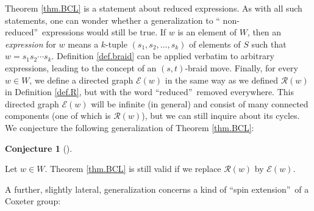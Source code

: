 \documentclass
[numbers=enddot,12pt,final,onecolumn,notitlepage,abstracton]{scrartcl}%
\theoremstyle{definition}
\newtheorem{conj}[theo]{Conjecture}
\newenvironment{conjecture}[1][]
{\begin{conj}[#1]\begin{leftbar}}
{\end{leftbar}\end{conj}}
\begin{document}
Theorem \ref{thm.BCL} is a statement about reduced expressions. As with all
such statements, one can wonder whether a generalization to \textquotedblleft
non-reduced\textquotedblright\ expressions would still be true. If $w$ is an
element of $W$, then an \emph{expression} for $w$ means a $k$-tuple $\left(
s_{1},s_{2},\ldots,s_{k}\right)  $ of elements of $S$ such that $w=s_{1}%
s_{2}\cdots s_{k}$. Definition \ref{def.braid} can be applied verbatim to
arbitrary expressions, leading to the concept of an $\left(  s,t\right)
$-braid move. Finally, for every $w\in W$, we define a directed graph
$\mathcal{E}\left(  w\right)  $ in the same way as we defined $\mathcal{R}%
\left(  w\right)  $ in Definition \ref{def.R}, but with the word
\textquotedblleft reduced\textquotedblright\ removed everywhere. This directed
graph $\mathcal{E}\left(  w\right)  $ will be infinite (in general) and
consist of many connected components (one of which is $\mathcal{R}\left(
w\right)  $), but we can still inquire about its cycles. We conjecture the
following generalization of Theorem \ref{thm.BCL}:

\begin{conjecture}
\label{conj.E(w)}Let $w\in W$. Theorem \ref{thm.BCL} is still valid if we
replace $\mathcal{R}\left(  w\right)  $ by $\mathcal{E}\left(  w\right)  $.
\end{conjecture}

A further, slightly lateral, generalization concerns a kind of
\textquotedblleft spin extension\textquotedblright\ of a Coxeter group:
\end{document}
